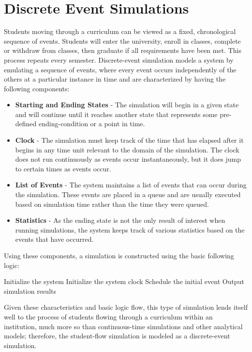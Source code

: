 \documentclass[botnum, fleqn]{unmeethesis}
\begin{document}
  \section{Discrete Event Simulations}
  Students moving through a curriculum can be viewed as a fixed, chronological sequence of events. Students will enter the university, enroll in classes, complete or withdraw from classes, then graduate if all requirements have been met. This process repeats every semester. Discrete-event simulation models a system by emulating a sequence of events, where every event occurs independently of the others at a particular instance in time and are characterized by having the following components:

  \begin{itemize}
  \item \textbf{Starting and Ending States} - The simulation will begin in a given state and will continue until it reaches another state that represents some pre-defined ending-condition or a point in time.
  \item \textbf{Clock} - The simulation must keep track of the time that has elapsed after it begins in any time unit relevant to the domain of the simulation. The clock does not run continuously as events occur instantaneously, but it does jump to certain times as events occur.
  \item \textbf{List of Events} - The system maintains a list of events that can occur during the simulation. These events are placed in a queue and are usually executed based on simulation time rather than the time they were queued.
  \item \textbf{Statistics} - As the ending state is not the only result of interest when running simulations, the system keeps track of various statistics based on the events that have occurred.
  \end{itemize}

  Using these components, a simulation is constructed using the basic following logic:

  \begin{algorithmic}[1]
  \STATE Initialize the system
  \STATE Initialize the system clock
  \STATE Schedule the initial event
  \ENDWHILE
  \STATE Output simulation results
  \end{algorithmic}

  Given these characteristics and basic logic flow, this type of simulation lends itself well to the process of students flowing through a curriculum within an institution, much more so than continuous-time simulations and other analytical models; therefore, the student-flow simulation is modeled as a discrete-event simulation.
\end{document}
